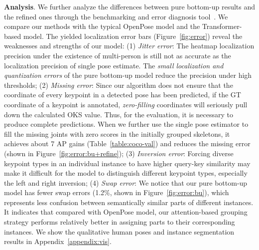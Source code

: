 \documentclass{article} \usepackage{iclr_conference,times}
\begin{document}
{\bf Analysis}. We further analyze the differences between pure bottom-up results and the refined ones through the benchmarking and error diagnosis tool~\citep{error:matteo2017}. We compare our methods with the typical OpenPose model and the Transformer-based model. The yielded localization error bars (Figure~\ref{fig:error})
reveal the weaknesses and strengths of our model: (1) \emph{Jitter error}: The heatmap localization precision under the existence of multi-person is still not as accurate as the localization precision of single pose estimate. The \textit{small localization and quantization errors} of the pure bottom-up model reduce the precision under high thresholds;
(2) \emph{Missing error}: Since our algorithm does not ensure that the coordinate of every keypoint in a detected pose has been predicted, if the GT coordinate of a keypoint is annotated, \textit{zero-filling} coordinates will seriously pull down the calculated OKS value. Thus, for the evaluation, it is necessary to produce complete predictions. When we further use the single pose estimator to fill the missing joints with zero scores in the initially grouped skeletons, it achieves about 7 AP gains (Table~\ref{table:coco-val}) and reduces the missing error (shown in Figure~\ref{fig:error:bu+refine});
(3) \emph{Inversion error}: Forcing diverse keypoint types in an individual instance to have higher query-key similarity may make it difficult for the model to distinguish different keypoint types, especially the left and right inversion;
(4) \emph{Swap error}: We notice that our pure bottom-up model has fewer swap errors (1.2$\%$, shown in Figure~\ref{fig:error:bu}), which represents less confusion between semantically similar parts of different instances. It indicates that compared with OpenPose model, our attention-based grouping strategy performs relatively better in assigning parts to their corresponding instances. We show the qualitative human poses and instance segmentation results in Appendix~\ref{appendix:vis}.
\end{document}
